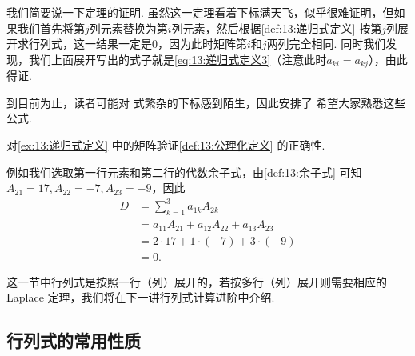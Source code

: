 我们简要说一下定理的证明. 虽然这一定理看着下标满天飞，似乎很难证明，但如果我们首先将第$j$列元素替换为第$i$列元素，然后根据\autoref{def:13:递归式定义} 按第$j$列展开求行列式，这一结果一定是0，因为此时矩阵第$i$和$j$两列完全相同. 同时我们发现，我们上面展开写出的式子就是\autoref{eq:13:递归式定义3}（注意此时$a_{ki}=a_{kj}$），由此得证.

到目前为止，读者可能对 式繁杂的下标感到陌生，因此安排了 希望大家熟悉这些公式.
\begin{example} \label{ex:13:递归式定义2}
    对\autoref{ex:13:递归式定义} 中的矩阵验证\autoref{def:13:公理化定义} 的正确性.
\end{example}

\begin{solution}
    例如我们选取第一行元素和第二行的代数余子式，由\autoref{def:13:余子式} 可知$A_{21}=17,A_{22}=-7,A_{23}=-9$，因此
    \begin{align*}
        D &=\sum_{k=1}^{3}a_{1k}A_{2k} \\
          &=a_{11}A_{21}+a_{12}A_{22}+a_{13}A_{23} \\
          &=2 \cdot 17+1 \cdot (-7)+3 \cdot (-9) \\
          &=0.
    \end{align*}
\end{solution}

这一节中行列式是按照一行（列）展开的，若按多行（列）展开则需要相应的 Laplace 定理，我们将在下一讲行列式计算进阶中介绍.

\subsection{行列式的常用性质}

